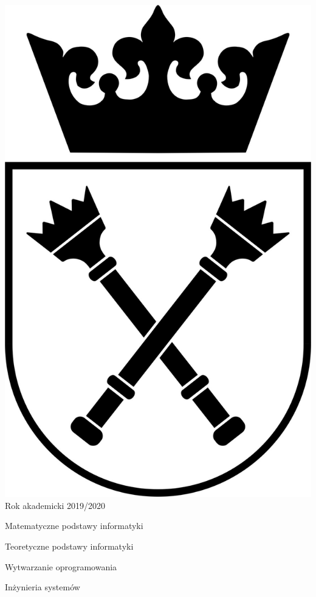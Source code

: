 \documentclass[12pt]{article}
\begin{document}
\begin{titlepage}
        \includegraphics[scale=0.27]{../graphics/uj.jpg}\\[2cm]

        {\large Rok akademicki 2019/2020}\\

        \vfill
    \end{titlepage}

    \tableofcontents

    \newpage

    \begin{center}{\LARGE Matematyczne podstawy informatyki}\end{center}

    

    \begin{center} {\LARGE Teoretyczne podstawy informatyki} \end{center}

    

    \begin{center}{\LARGE Wytwarzanie oprogramowania}\end{center}

    

    \begin{center}{\Large Inżynieria systemów}\end{center}

    
\end{document}
